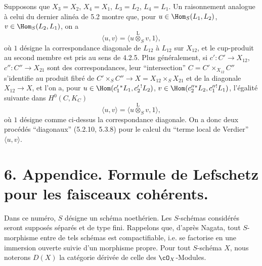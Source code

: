 Supposons que $X_3=X_2$, $X_4=X_1$, $L_3=L_2$, $L_4=L_1$. Un raisonnement analogue à celui du dernier alinéa de 5.2 montre que, pour $u\in\Hom_S(L_1,L_2)$, $v\in\Hom_S(L_2,L_1)$, on a
\begin{equation}
\tag{5.3.7}
\langle u,v\rangle=\langle u\overset{\mathrm{L}}{\otimes}_Sv,1\rangle,
\end{equation}
où $1$ désigne la correspondance diagonale de $L_{12}$ à $L_{12}$ sur $X_{12}$, et le cup-produit au second membre est pris au sens de 4.2.5. Plus généralement, si $c':C'\to X_{12}$, $c'':C''\to X_{21}$ sont des correspondances, leur ``intersection'' $C=C'\times_{X_{12}}C''$ s'identifie au produit fibré de $C'\times_SC''\to X=X_{12}\times_SX_{21}$ et de la diagonale $X_{12}\to X$, et l'on a, pour $u\in\Hom(c_1'{}^*L_1,c_2'{}^!L_2)$, $v\in\Hom(c_2''{}^*L_2,c_1''{}^!L_1)$, l'égalité suivante dans $H^0(C,K_C)$
\begin{equation}
\tag{5.3.8}
\langle u,v\rangle=\langle u\overset{\mathrm{L}}{\otimes}_Sv,1\rangle,
\end{equation}
où $1$ désigne comme ci-dessus la correspondance diagonale. On a donc deux procédés ``diagonaux'' (5.2.10, 5.3.8) pour le calcul du ``terme local de Verdier'' $\langle u,v\rangle$.

\section*{6. Appendice. Formule de Lefschetz pour les faisceaux cohérents.}

Dans ce numéro, $S$ désigne un schéma noethérien. Les $S$-schémas considérés seront supposés séparés et de type fini. Rappelons que, d'après Nagata, tout $S$-morphisme entre de tels schémas est compactifiable, i.e. se factorise en une immersion ouverte suivie d'un morphisme propre. Pour tout $S$-schéma $X$, nous noterons $D(X)$ la catégorie dérivée de celle des $\cO_X$-Modules.

